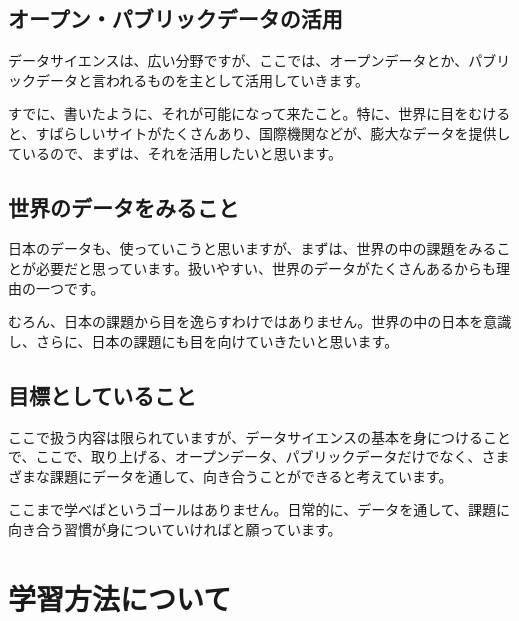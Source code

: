 \documentclass[
  xelatex, ja=standard]{bxjsbook}
\theoremstyle{definition}
\theoremstyle{definition}
\theoremstyle{definition}
\theoremstyle{definition}
\theoremstyle{remark}
\begin{document}
\hypertarget{ux30aaux30fcux30d7ux30f3ux30d1ux30d6ux30eaux30c3ux30afux30c7ux30fcux30bfux306eux6d3bux7528}{%
\subsection{オープン・パブリックデータの活用}\label{ux30aaux30fcux30d7ux30f3ux30d1ux30d6ux30eaux30c3ux30afux30c7ux30fcux30bfux306eux6d3bux7528}}

データサイエンスは、広い分野ですが、ここでは、オープンデータとか、パブリックデータと言われるものを主として活用していきます。

すでに、書いたように、それが可能になって来たこと。特に、世界に目をむけると、すばらしいサイトがたくさんあり、国際機関などが、膨大なデータを提供しているので、まずは、それを活用したいと思います。

\hypertarget{ux4e16ux754cux306eux30c7ux30fcux30bfux3092ux307fux308bux3053ux3068}{%
\subsection{世界のデータをみること}\label{ux4e16ux754cux306eux30c7ux30fcux30bfux3092ux307fux308bux3053ux3068}}

日本のデータも、使っていこうと思いますが、まずは、世界の中の課題をみることが必要だと思っています。扱いやすい、世界のデータがたくさんあるからも理由の一つです。

むろん、日本の課題から目を逸らすわけではありません。世界の中の日本を意識し、さらに、日本の課題にも目を向けていきたいと思います。

\hypertarget{ux76eeux6a19ux3068ux3057ux3066ux3044ux308bux3053ux3068}{%
\subsection{目標としていること}\label{ux76eeux6a19ux3068ux3057ux3066ux3044ux308bux3053ux3068}}

ここで扱う内容は限られていますが、データサイエンスの基本を身につけることで、ここで、取り上げる、オープンデータ、パブリックデータだけでなく、さまざまな課題にデータを通して、向き合うことができると考えています。

ここまで学べばというゴールはありません。日常的に、データを通して、課題に向き合う習慣が身についていければと願っています。

\hypertarget{ux5b66ux7fd2ux65b9ux6cd5ux306bux3064ux3044ux3066}{%
\section{学習方法について}\label{ux5b66ux7fd2ux65b9ux6cd5ux306bux3064ux3044ux3066}}
\end{document}

